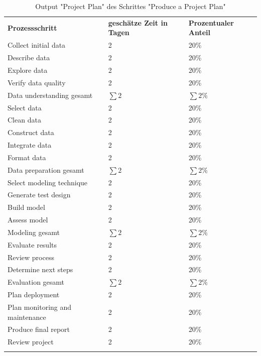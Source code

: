 \begin{longtable}[!h]{|p{4cm}|p{4cm}|p{4cm}|}
\hline
\textbf{Prozessschritt} & \textbf{geschätze Zeit in Tagen} & \textbf{Prozentualer Anteil} \\
\hhline{===}
Collect initial data & 2 & 20\% \\ \hline
Describe data & 2 & 20\% \\ \hline
Explore data & 2 & 20\% \\ \hline
Verify data quality & 2 & 20\% \\ \hline
Data understanding gesamt & $\sum 2$ &  $\sum 2 \%$ \\ \hline
Select data & 2 & 20\% \\ \hline
Clean data & 2 & 20\% \\ \hline
Construct data & 2 & 20\% \\ \hline
Integrate data & 2 & 20\% \\ \hline
Format data  & 2 & 20\% \\ \hline
Data preparation gesamt & $\sum 2$ &  $\sum 2 \%$ \\ \hline
Select modeling technique & 2 & 20\% \\ \hline
Generate test design & 2 & 20\% \\ \hline
Build model & 2 & 20\% \\ \hline
Assess model & 2 & 20\% \\ \hline
Modeling gesamt & $\sum 2$ &  $\sum 2 \%$ \\ \hline
Evaluate results & 2 & 20\% \\ \hline
Review process & 2 & 20\% \\ \hline
Determine next steps & 2 & 20\% \\ \hline
Evaluation gesamt & $\sum 2$ &  $\sum 2 \%$ \\ \hline
Plan deployment & 2 & 20\% \\ \hline
Plan monitoring and maintenance & 2 & 20\% \\ \hline
Produce final report & 2 & 20\% \\ \hline
Review project & 2 & 20\% \\ \hline
\caption{Output "Project Plan" des Schrittes "Produce a Project Plan"}
\label{tab:projectPlan}
\end{longtable}

